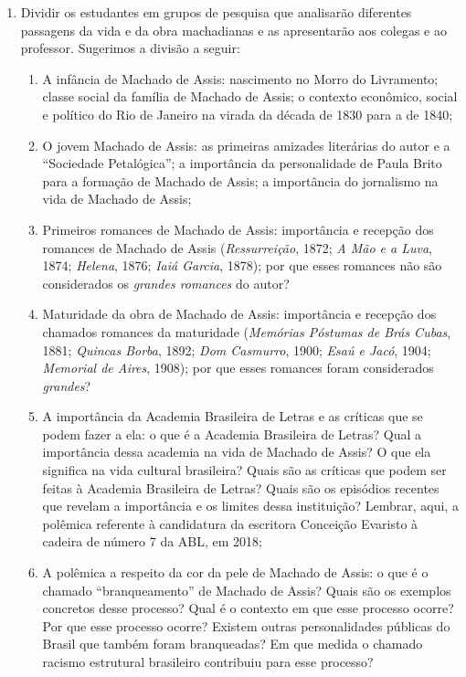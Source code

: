 \documentclass{extarticle}
\begin{document}
\begin{enumerate}
\item Dividir os estudantes em grupos de pesquisa que analisarão diferentes
passagens da vida e da obra machadianas e as apresentarão aos colegas e
ao professor. Sugerimos a divisão a seguir:

\begin{enumerate}
\item A infância de Machado de Assis: nascimento no Morro do Livramento;
classe social da família de Machado de Assis; o contexto econômico,
social e político do Rio de Janeiro na virada da década de 1830 para a
de 1840;

\item O jovem Machado de Assis: as primeiras amizades literárias do autor e
a ``Sociedade Petalógica''; a importância da personalidade de Paula
Brito para a formação de Machado de Assis; a importância do jornalismo
na vida de Machado de Assis;

\item Primeiros romances de Machado de Assis: importância e recepção dos
romances de Machado de Assis (\emph{Ressurreição}, 1872; \emph{A Mão e a
Luva}, 1874; \emph{Helena}, 1876; \emph{Iaiá Garcia}, 1878); por que
esses romances não são considerados os \emph{grandes romances} do autor?

\item Maturidade da obra de Machado de Assis: importância e recepção dos
chamados romances da maturidade (\emph{Memórias Póstumas de Brás Cubas},
1881; \emph{Quincas Borba}, 1892; \emph{Dom Casmurro}, 1900; \emph{Esaú
e Jacó}, 1904; \emph{Memorial de Aires}, 1908); por que esses romances
foram considerados \emph{grandes}?

\item A importância da Academia Brasileira de Letras e as críticas que se
podem fazer a ela: o que é a Academia Brasileira de Letras? Qual a
importância dessa academia na vida de Machado de Assis? O que ela
significa na vida cultural brasileira? Quais são as críticas que podem
ser feitas à Academia Brasileira de Letras? Quais são os episódios
recentes que revelam a importância e os limites dessa instituição?
Lembrar, aqui, a polêmica referente à candidatura da escritora Conceição
Evaristo à cadeira de número 7 da ABL, em 2018;

\item A polêmica a respeito da cor da pele de Machado de Assis: o que é o
chamado ``branqueamento'' de Machado de Assis? Quais são os exemplos
concretos desse processo? Qual é o contexto em que esse processo ocorre?
Por que esse processo ocorre? Existem outras personalidades públicas do
Brasil que também foram branqueadas? Em que medida o chamado racismo
estrutural brasileiro contribuiu para esse processo?


\end{enumerate}
\end{enumerate}
\end{document}
